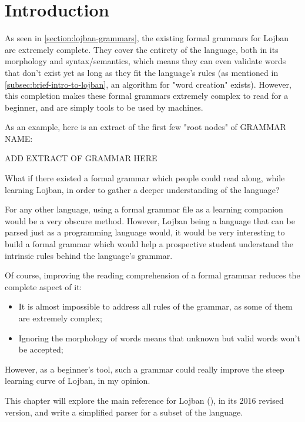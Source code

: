 \chapter{Introduction}

\vspace{0.5cm}

As seen in \ref{section:lojban-grammars}, the existing formal grammars for Lojban are extremely complete.
They cover the entirety of the language, both in its morphology and syntax/semantics, which means they can even validate words that don't exist yet
as long as they fit the language's rules (as mentioned in \ref{subsec:brief-intro-to-lojban}, an algorithm for "word creation" exists).
However, this completion makes these formal grammars extremely complex to read for a beginner, and are simply tools to be used by machines. \newline

As an example, here is an extract of the first few "root nodes" of GRAMMAR NAME: \newline

ADD EXTRACT OF GRAMMAR HERE \newline

What if there existed a formal grammar which people could read along, while learning Lojban, in order to gather a deeper understanding of the language?\newline

For any other language, using a formal grammar file as a learning companion would be a very obscure method.
However, Lojban being a language that can be parsed just as a programming language would, it would be very interesting to build a formal grammar
which would help a prospective student understand the intrinsic rules behind the language's grammar. \newline

Of course, improving the reading comprehension of a formal grammar reduces the complete aspect of it:

\begin{itemize}
  \item It is almost impossible to address all rules of the grammar, as some of them are extremely complex;
  \item Ignoring the morphology of words means that unknown but valid words won't be accepted;
\end{itemize}

However, as a beginner's tool, such a grammar could really improve the steep learning curve of Lojban, in my opinion.\newline

This chapter will explore the main reference for Lojban (\cite{cowan1997complete}), in its 2016 revised version, and write a simplified parser for a subset of the language.



